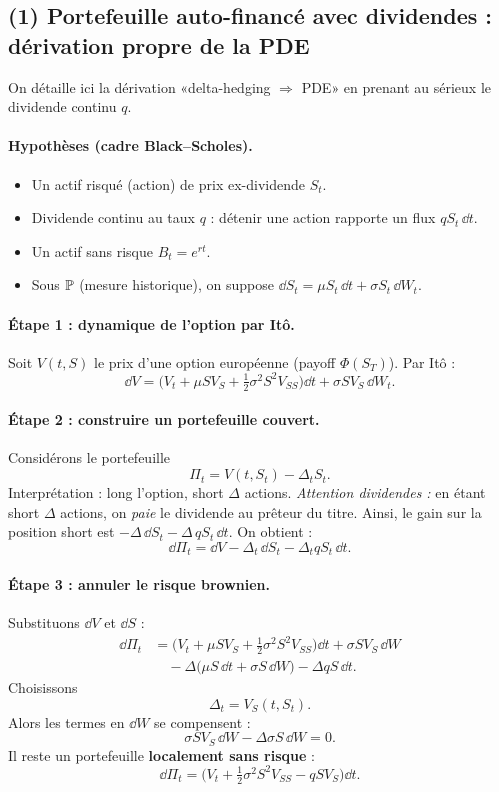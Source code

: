 
\subsection*{(1) Portefeuille auto-financé avec dividendes : dérivation propre de la PDE}
On détaille ici la dérivation «delta-hedging $\Rightarrow$ PDE» en prenant au sérieux le dividende continu $q$.

\paragraph{Hypothèses (cadre Black--Scholes).}
\begin{itemize}[leftmargin=*]
\item Un actif risqué (action) de prix ex-dividende $S_t$.
\item Dividende continu au taux $q$ : détenir une action rapporte un flux $qS_t\,\dd t$.
\item Un actif sans risque $B_t=e^{rt}$.
\item Sous $\mathbb{P}$ (mesure historique), on suppose $\dd S_t=\mu S_t\,\dd t+\sigma S_t\,\dd W_t$.
\end{itemize}

\paragraph{Étape 1 : dynamique de l'option par Itô.}
Soit $V(t,S)$ le prix d'une option européenne (payoff $\Phi(S_T)$).
Par Itô :
\[
\dd V
=\Big(V_t+\mu S V_S+\tfrac12\sigma^2S^2V_{SS}\Big)\dd t
 +\sigma S V_S\,\dd W_t.
\]

\paragraph{Étape 2 : construire un portefeuille couvert.}
Considérons le portefeuille
\[
\Pi_t = V(t,S_t)-\Delta_t S_t.
\]
Interprétation : long l'option, short $\Delta$ actions.
\emph{Attention dividendes :} en étant short $\Delta$ actions, on \emph{paie} le dividende au prêteur du titre.
Ainsi, le gain sur la position short est $-\Delta\,\dd S_t - \Delta\,qS_t\,\dd t$.
On obtient :
\[
\dd \Pi_t=\dd V - \Delta_t\,\dd S_t - \Delta_t q S_t\,\dd t.
\]

\paragraph{Étape 3 : annuler le risque brownien.}
Substituons $\dd V$ et $\dd S$ :
\[
\begin{aligned}
\dd \Pi_t
&=\Big(V_t+\mu S V_S+\tfrac12\sigma^2S^2V_{SS}\Big)\dd t +\sigma S V_S\,\dd W\\
&\quad-\Delta\big(\mu S\,\dd t+\sigma S\,\dd W\big)-\Delta qS\,\dd t.
\end{aligned}
\]
Choisissons
\[
\boxed{\Delta_t=V_S(t,S_t).}
\]
Alors les termes en $\dd W$ se compensent :
\[
\sigma S V_S\,\dd W - \Delta\sigma S\,\dd W = 0.
\]
Il reste un portefeuille \textbf{localement sans risque} :
\[
\dd \Pi_t=\Big(V_t+\tfrac12\sigma^2S^2V_{SS}-qSV_S\Big)\dd t.
\]


